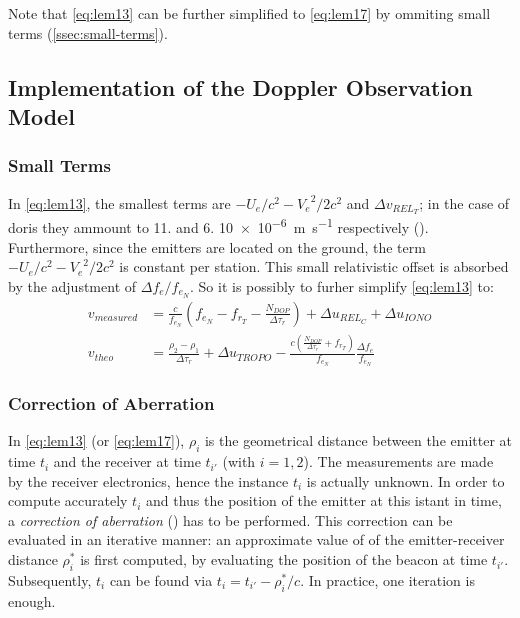 Note that \autoref{eq:lem13} can be further simplified to \autoref{eq:lem17} by 
ommiting small terms (\autoref{ssec:small-terms}).


\subsection{Implementation of the Doppler Observation Model}\label{ssec:obs-model-implementation}

\subsubsection{Small Terms}\label{sssec:small-terms}
In \autoref{eq:lem13}, the smallest terms are \(-U_e / c^2 - {V_e}^2 / 2 c^2\) and 
\(\Delta v_{{REL}_T}\); in the case of \gls{doris} they ammount to \num{11.} and 
\num{6.} \SI{10e-6}{\meter\per\second} respectively (\cite{Lemoine2016}). 
Furthermore, since the emitters are located on the ground, the term 
\(-U_e / c^2 - {V_e}^2 / 2 c^2\) is constant per station. This small 
relativistic offset is absorbed by the adjustment of \(\Delta f_e / f_{e_N}\). 
So it is possibly to furher simplify \autoref{eq:lem13} to:
\begin{subequations}\label{eq:lem17}
    \begin{align}
        v_{measured} & = \frac{c}{f_{e_N}} (f_{e_N} - f_{r_T} -
          \frac{N_{DOP}}{\Delta\tau_r}) + 
          \Delta u_{{REL}_C} + \Delta u_{IONO} \label{eq:lem17a}\\
        v_{theo} &= \frac{\rho_2 - \rho_1}{\Delta\tau_r} + \Delta u_{TROPO} - 
          \frac{c(\frac{N_{DOP}}{\Delta\tau_r} + f_{r_T})}{f_{e_N}} 
          \frac{\Delta f_e}{f_{e_N}} \label{eq:lem17b}
    \end{align}
\end{subequations}

\subsubsection{Correction of Aberration}\label{sssec:doris-aberration}
In \autoref{eq:lem13} (or \autoref{eq:lem17}), $\rho _i$ is the geometrical distance 
between the emitter at time $t_i$ and the receiver at time $t_{i'}$ (with $i=1,2$). 
The measurements are made by the receiver electronics, hence the instance $t_i$ is 
actually unknown. In order to compute accurately $t_i$ and thus the position of 
the emitter at this istant in time, a \emph{correction of aberration} (\cite{Lemoine2016}) 
has to be performed. This correction can be evaluated in an iterative manner: an 
approximate value of of the emitter-receiver distance $\rho ^{*} _i$ is first computed, 
by evaluating the position of the beacon at time $t_{i'}$. Subsequently, $t_i$ can be 
found via $t_i = t_{i'} - \rho ^{*} _i / c$. In practice, one iteration is enough.

